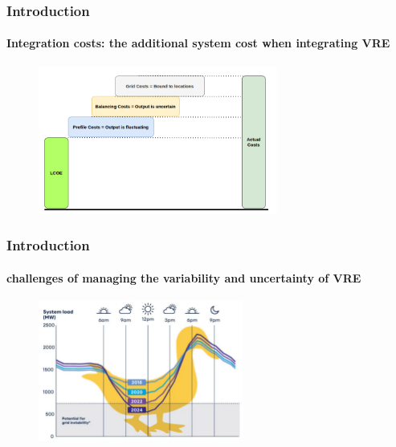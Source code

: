 \documentclass[aspectratio=169]{beamer}
\begin{document}
\begin{frame}
  \frametitle{Introduction}
  \framesubtitle{Integration costs: the additional system cost
when integrating VRE}
  \begin{figure}
    \centering
    \includegraphics[width=0.7\textwidth]{prof.png}
  \end{figure}
\end{frame}


\begin{frame}
\frametitle{Introduction}
\framesubtitle{challenges of managing the variability and uncertainty of VRE}
  \begin{figure}
    \centering
    \includegraphics[width=0.6\textwidth]{duck.png}
  \end{figure}
\end{frame}

\end{document}
